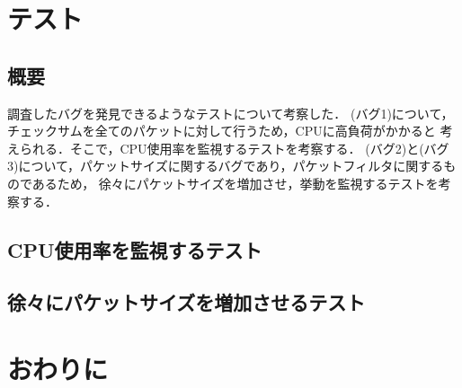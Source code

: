 \documentclass[12pt]{jsarticle}
\begin{document}
\section{テスト}
\subsection{概要}
調査したバグを発見できるようなテストについて考察した．
(バグ1)について，チェックサムを全てのパケットに対して行うため，CPUに高負荷がかかると
考えられる．そこで，CPU使用率を監視するテストを考察する．
(バグ2)と(バグ3)について，パケットサイズに関するバグであり，パケットフィルタに関するものであるため，
徐々にパケットサイズを増加させ，挙動を監視するテストを考察する．

\subsection{CPU使用率を監視するテスト}

\subsection{徐々にパケットサイズを増加させるテスト}


\section{おわりに}
\end{document}
